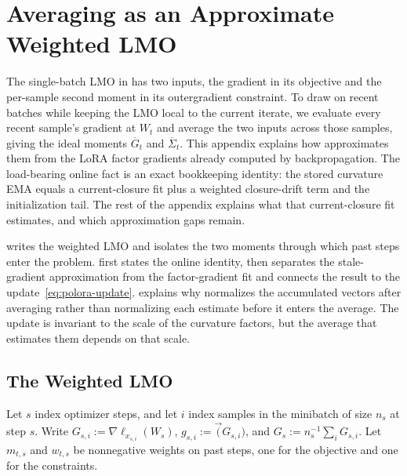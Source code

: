 \section{Averaging as an Approximate Weighted LMO}
\label{app:matnormal-03}

The single-batch LMO in  has two inputs, the
gradient in its objective and the per-sample second moment in its
outergradient constraint. To draw on recent batches while keeping the LMO
local to the current iterate, we evaluate every recent sample's gradient at
$W_t$ and average the two inputs across those samples, giving the ideal
moments $\overline G_t$ and $\overline\Sigma_t$. This appendix explains how
approximates them from the LoRA factor gradients already computed by
backpropagation. The load-bearing online fact is an exact bookkeeping identity:
the stored curvature EMA equals a current-closure fit plus a weighted
closure-drift term and the initialization tail. The rest of the appendix
explains what that current-closure fit estimates, and which approximation gaps
remain.

 writes the weighted LMO and isolates the two
moments through which past steps enter the problem.
first states the online identity, then separates the stale-gradient
approximation from the factor-gradient fit and connects the result to the
update~\eqref{eq:polora-update}.
 explains why  normalizes the
accumulated vectors after averaging rather than normalizing each estimate
before it enters the average. The update is invariant to the scale of the
curvature factors, but the average that estimates them depends on that scale.

\subsection{The Weighted LMO}
\label{sec:weighted-lmo-03}

Let $s$ index optimizer steps, and let $i$ index samples in the
minibatch of size $n_s$ at step $s$. Write
$G_{s,i}:=\nabla\ell_{x_{s,i}}(W_s)$,
$g_{s,i}:=\vec(G_{s,i})$, and
$G_s:=n_s^{-1}\sum_iG_{s,i}$. Let $m_{t,s}$ and $w_{t,s}$ be
nonnegative weights on past steps, one for the objective and one for
the constraints.

